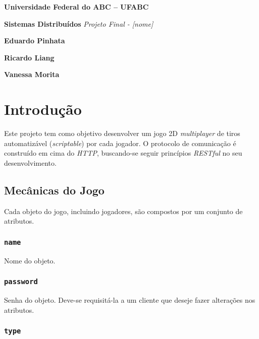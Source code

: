 \documentclass[12pt,a4paper]{article}
\begin{document}
\pagestyle{plain}

\begin{titlepage}
\begin{center}
	\textbf{{\large Universidade Federal do ABC -- UFABC}}

	\textbf{\large Sistemas Distribuídos}
	\vfill
	\textit{\Large Projeto Final - [nome]}
	\vfill
	\begin{flushright}
		\textbf{\large Eduardo Pinhata}

		\textbf{\large Ricardo Liang}

		\textbf{\large Vanessa Morita}
	\end{flushright}
	\vfill
\end{center}
\end{titlepage}

\tableofcontents

\pagebreak \section{Introdução}

Este projeto tem como objetivo desenvolver um jogo 2D \textit{multiplayer} de
tiros automatizável (\textit{scriptable}) por cada jogador. O protocolo de
comunicação é construído em cima do \textit{HTTP}, buscando-se seguir
princípios \textit{RESTful} no seu desenvolvimento.

\subsection{Mecânicas do Jogo}

Cada objeto do jogo, incluindo jogadores, são compostos por um conjunto de
atributos.

\subsubsection{\texttt{name}}

Nome do objeto.

\subsubsection{\texttt{password}}

Senha do objeto. Deve-se requisitá-la a um cliente que deseje fazer
alterações nos atributos.

\subsubsection{\texttt{type}}
\end{document}

